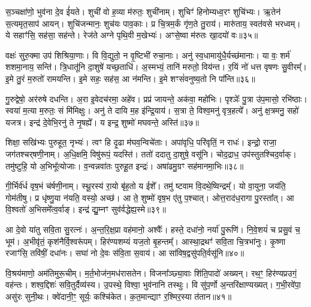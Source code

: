 स॒ञ्चक्षा॑णो॒ भुव॑ना दे॒व ई॑यते।
शुची॑ वो ह॒व्या म॑रुतः॒ शुची॑नाम्।
शुचिꣳ॑ हिनोम्यध्व॒रꣳ शुचि॑भ्यः।
ऋ॒तेन॑ स॒त्यमृत॒साप॑ आयन्।
शुचि॑जन्मानः॒ शुच॑यः पाव॒काः।
प्र चि॒त्रम॒र्कं गृ॑ण॒ते तु॒राय॑।
मारु॑ताय॒ स्वत॑वसे भरध्वम्।
ये सहाꣳ॑सि॒ सह॑सा॒ सह॑न्ते।
रेज॑ते अग्ने पृथि॒वी म॒खेभ्यः॑।
अꣳसे॒ष्वा म॑रुतः खा॒दयो॑ वः॥३५॥

वक्षः॑ सुरु॒क्मा उप॑ शिश्रिया॒णाः।
वि वि॒द्युतो॒ न वृ॒ष्टिभी॑ रुचा॒नाः।
अनु॑ स्व॒धामायु॑धै॒र्यच्छ॑मानाः।
या वः॒ शर्म॑ शशमा॒नाय॒ सन्ति॑।
त्रि॒धातू॑नि दा॒शुषे॑ यच्छ॒ताधि॑।
अ॒स्मभ्यं॒ तानि॑ मरुतो॒ विय॑न्त।
र॒यिं नो॑ धत्त वृषणः सु॒वीरम्᳚।
इ॒मे तु॒रं म॒रुतो॑ रामयन्ति।
इ॒मे सहः॒ सह॑स॒ आ न॑मन्ति।
इ॒मे शꣳसं॑वनुष्य॒तो नि पा᳚न्ति॥३६॥

गु॒रुद्वेषो॒ अर॑रुषे दधन्ति।
अ॒रा इ॒वेदच॑रमा॒ अहे॑व।
प्रप्र॑ जायन्ते॒ अक॑वा॒ महो॑भिः।
पृश्ञेः᳚ पु॒त्रा उ॑प॒मासो॒ रभि॑ष्ठाः।
स्वया॑ म॒त्या म॒रुतः॒ सं मि॑मिक्षुः।
अनु॑ ते दायि म॒ह इ॑न्द्रि॒याय॑।
स॒त्रा ते॒ विश्व॒मनु॑ वृत्र॒हत्ये᳚।
अनु॑ क्ष॒त्रमनु॒ सहो॑ यजत्र।
इन्द्र॑ दे॒वेभि॒रनु॑\- ते नृ॒षह्ये᳚।
य इन्द्र॒ शुष्मो॑ मघवन्ते॒ अस्ति॑॥३७॥

शिक्षा॒ सखि॑भ्यः पुरुहूत॒ नृभ्यः॑।
त्वꣳ हि दृ॒ढा म॑घव॒न्विचे॑ताः।
अपा॑वृधि॒ परि॑वृतिं॒ न राधः॑।
इन्द्रो॒ राजा॒ जग॑तश्चर्‌\mbox{}षणी॒नाम्।
अ॒धि॒क्षमि॒ विषु॑रूपं॒ यदस्ति॑।
ततो॑ ददातु दा॒शुषे॒ वसू॑नि।
चोद॒द्राध॒ उप॑स्तुतश्चिद॒र्वाक्।
तमु॑ष्टुहि॒ यो अ॒भिभू᳚त्योजाः।
व॒न्वन्नवा॑तः पुरुहू॒त इन्द्रः॑।
अषा॑ढमु॒ग्रꣳ सह॑मानमा॒भिः॥३८॥

गी॒र्भिर्व॑र्ध वृष॒भं च॑र्\mbox{}षणी॒नाम्।
स्थू॒रस्य॑ रा॒यो बृ॑ह॒तो य ईशे᳚।
तमु॑ ष्टवाम वि॒दथे॒ष्विन्द्रम्᳚।
यो वा॒युना॒ जय॑ति॒ गोम॑तीषु।
प्र धृ॑ष्णु॒या न॑यति॒ वस्यो॒ अच्छ॑।
आ ते॒ शुष्मो॑ वृष॒भ ए॑तु प॒श्चात्।
ओत्त॒राद॑ध॒रागा पु॒रस्ता᳚त्।
आ वि॒श्वतो॑ अ॒भिसमे᳚त्व॒र्वाङ्।
इन्द्र॑ द्यु॒म्नꣳ सुव॑र्वद्धेह्य॒स्मे॥३९॥\anuvakamend[व॒राहै᳚र्वि॒श्वहा॑\-ऽजनिष्ट पू॒षोद्वरी॑वृजत्खा॒दयो॑ वः पा॒न्त्यस्त्या॒भिर्नव॑ च]

आ दे॒वो या॑तु सवि॒ता सु॒रत्नः॑।
अ॒न्त॒रि॒क्ष॒प्रा वह॑मानो॒ अश्वैः᳚।
हस्ते॒ दधा॑नो॒ नर्या॑ पु॒रूणि॑।
नि॒वे॒शयं॑ च प्रसु॒वं च॒ भूम॑।
अ॒भीवृ॑तं॒ कृश॑नैर्वि॒श्वरू॑पम्।
हिर॑ण्यशम्यं यज॒तो बृ॒हन्तम्᳚।
आस्था॒द्रथꣳ॑ सवि॒ता चि॒त्रभा॑नुः।
कृ॒ष्णा रजाꣳ॑सि॒ तवि॑षीं॒ दधा॑नः।
सघा॑ नो दे॒वः स॑वि॒ता स॒वाय॑।
आ सा॑विष॒द्वसु॑पति॒र्वसू॑नि॥४०॥

वि॒श्रय॑माणो॒ अम॑तिमुरू॒चीम्।
म॒र्त॒भोज॑न॒मध॑रासतेन।
विजना᳚ञ्छ्या॒वाः शि॑ति॒पादो॑ अख्यन्।
रथ॒ꣳ॒ हिर॑ण्यप्रउगं॒ वह॑न्तः।
शश्व॒द्दिशः॑ सवि॒तुर्दैव्य॑स्य।
उ॒पस्थे॒ विश्वा॒ भुव॑नानि तस्थुः।
वि सु॑प॒र्णो अ॒न्तरि॑क्षाण्यख्यत्।
ग॒भी॒रवे॑पा॒ असु॑रः सुनी॒थः।
क्वे॑दानी॒ꣳ॒ सूर्यः॒ कश्चि॑केत।
क॒त॒मान्द्याꣳ र॒श्मिर॒स्या त॑तान॥४१॥

